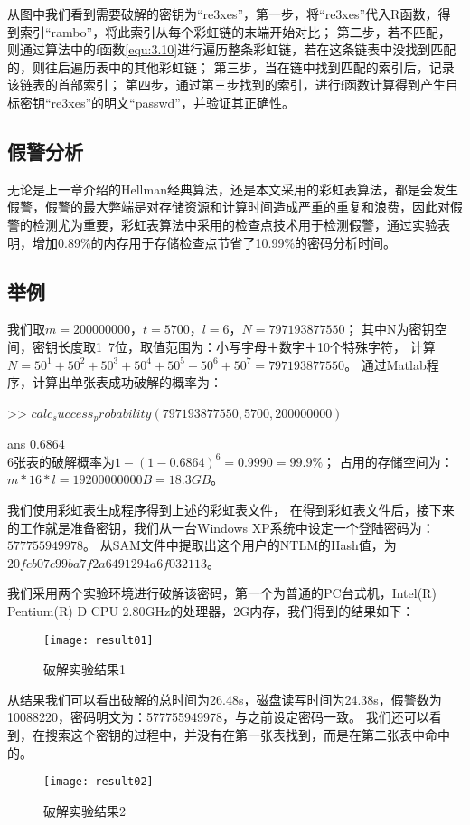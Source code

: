 从图中我们看到需要破解的密钥为“re3xes”，第一步，将“re3xes”代入R函数，得到索引“rambo”，将此索引从每个彩虹链的末端开始对比；
第二步，若不匹配，则通过算法中的f函数\eqref{equ:3.10}进行遍历整条彩虹链，若在这条链表中没找到匹配的，则往后遍历表中的其他彩虹链；
第三步，当在链中找到匹配的索引后，记录该链表的首部索引；
第四步，通过第三步找到的索引，进行f函数计算得到产生目标密钥“re3xes”的明文“passwd”，并验证其正确性。
\subsection{假警分析}
无论是上一章介绍的Hellman经典算法，还是本文采用的彩虹表算法，都是会发生假警，假警的最大弊端是对存储资源和计算时间造成严重的重复和浪费，因此对假警的检测尤为重要，彩虹表算法中采用的检查点技术用于检测假警，通过实验表明，增加0.89\%的内存用于存储检查点节省了10.99\%的密码分析时间。
\subsection{举例}
我们取$m=200000000，t=5700，l=6，N=797193877550$；
其中N为密钥空间，密钥长度取1~7位，取值范围为：小写字母＋数字＋10个特殊字符，
计算$N=50^1 + 50^2 + 50^3 + 50^4 + 50^5 + 50^6 + 50^7 = 797193877550$。
通过Matlab程序，计算出单张表成功破解的概率为：

\qquad       >> $calc_success_probability(797193877550, 5700, 200000000) $

\qquad  \qquad            ans 0.6864 \\
6张表的破解概率为$1 - (1 - 0.6864) ^ 6 = 0.9990=99.9\%$；
占用的存储空间为：$m * 16 * l = 19200000000 B = 18.3 GB$。

我们使用彩虹表生成程序得到上述的彩虹表文件，
在得到彩虹表文件后，接下来的工作就是准备密钥，我们从一台Windows XP系统中设定一个登陆密码为：$577755949978$。
从SAM文件中提取出这个用户的NTLM的Hash值，为$20fcb07c99ba7f2a6491294a6f032113$。

我们采用两个实验环境进行破解该密码，第一个为普通的PC台式机，Intel(R) Pentium(R) D CPU 2.80GHz的处理器，2G内存，我们得到的结果如下：
\begin{figure}[!ht]
\centering 
\texttt{[image: result01]}
\caption{破解实验结果1}
\end{figure}
从结果我们可以看出破解的总时间为26.48s，磁盘读写时间为24.38s，假警数为10088220，密码明文为：577755949978，与之前设定密码一致。
我们还可以看到，在搜索这个密钥的过程中，并没有在第一张表找到，而是在第二张表中命中的。
\begin{figure}[!ht]
\centering
\texttt{[image: result02]}
\caption{破解实验结果2}
\end{figure}

